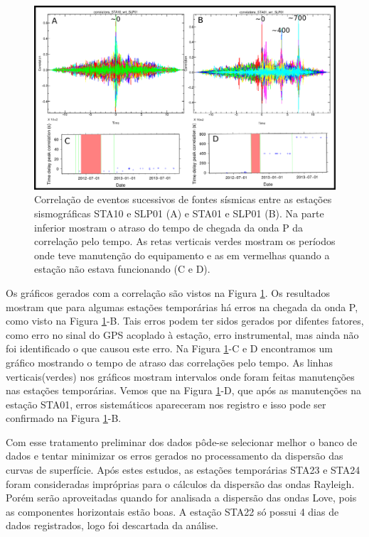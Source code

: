 \begin{figure}[!ht]
\centering
\includegraphics[scale=0.4]{Figs/correlacao_tempo_de_chegada_resultado.png}
\caption[Correlação de eventos sucessivos de fontes sísmicas entre duas estações sismográficas]{Correlação de eventos sucessivos de fontes sísmicas entre as estações sismográficas STA10 e SLP01 (A) e  STA01 e SLP01 (B). Na parte inferior mostram o atraso do tempo de chegada da onda P da correlação pelo tempo. As retas verticais verdes mostram os períodos onde teve manutenção do equipamento e as em vermelhas quando a estação não estava funcionando (C e D).}
\label{teste_tempo_results}
\end{figure}

Os gráficos gerados com a correlação são vistos na Figura \ref{teste_tempo_results}. Os resultados mostram que para algumas estações temporárias há erros na chegada da onda P, como visto na Figura \ref{teste_tempo_results}-B. Tais erros podem ter sidos gerados por difentes fatores, como erro no sinal do GPS acoplado à estação, erro instrumental, mas ainda não foi identificado o que causou este erro. Na Figura \ref{teste_tempo_results}-C e D encontramos um gráfico mostrando o tempo de atraso das correlações pelo tempo. As linhas verticais(verdes) nos gráficos mostram intervalos onde foram feitas manutenções nas estações temporárias. Vemos que na Figura \ref{teste_tempo_results}-D, que após as manutenções na estação STA01, erros sistemáticos apareceram nos registro e isso pode ser confirmado na Figura \ref{teste_tempo_results}-B.

Com esse tratamento preliminar dos dados pôde-se selecionar melhor o banco de dados e tentar minimizar os erros gerados no processamento da dispersão das curvas de superfície. Após estes estudos, as estações temporárias STA23 e STA24 foram consideradas impróprias para o cálculos da dispersão das ondas Rayleigh. Porém serão aproveitadas quando for analisada a dispersão das ondas Love, pois as componentes horizontais estão boas. A estação STA22 só possui 4 dias de dados registrados, logo foi descartada da análise.
